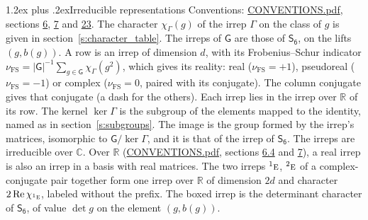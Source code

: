 \documentclass[10pt,a4paper]{article}
\makeatletter
\renewcommand\section{\@startsection{section}{1}{\z@}{-3ex plus -1ex minus -.2ex}%
  {1.2ex plus .2ex}{\normalfont\large\sffamily\bfseries\color{parttitle}}}
\numberwithin{equation}{section}
\newcommand{\grp}[1]{\mathsf{#1}}
\newcommand{\irr}[1]{\text{\normalfont\scshape #1}}
\newcommand{\conjpair}[1]{{}^{#1}}
\newcommand{\irchar}[1]{\chi_{#1}}
\newcommand{\fsind}{\nu_{\mathrm{FS}}}
\makeatother
\begin{document}
\section{Irreducible representations}\label{s:irreps}
Conventions: \href{../../CONVENTIONS.pdf}{CONVENTIONS.pdf}, sections \href{../../../rotation/CONVENTIONS.pdf\#conv.6}{6}, \href{../../../rotation/CONVENTIONS.pdf\#conv.7}{7} and \href{../../CONVENTIONS.pdf\#conv.23}{23}.
\leavevmode\label{n:function.character}\label{n:irrep.Gamma}The character $\irchar{\Gamma}(g)$ of the irrep $\Gamma$ on the class of $g$ is given in section~\ref{s:character_table}. The irreps of $\grp{G}$ are those of \href{../../../rotation/data/pdf/S6.pdf}{$\grp{S_{6}}$}, on the lifts $(g, b(g))$.
\leavevmode\label{n:index.dimension}\label{n:index.frobenius}\label{n:head.irrep}\label{n:head.reality}A row is an irrep of dimension $d$, with its Frobenius--Schur indicator $\fsind = |\grp{G}|^{-1}\allowbreak\sum_{g\in\grp{G}}\irchar{\Gamma}(g^2)$, which gives its reality: real ($\fsind = +1$), pseudoreal ($\fsind = -1$) or complex ($\fsind = 0$, paired with its conjugate). \label{n:head.conjugate}The column conjugate gives that conjugate (a dash for the others). \label{n:head.over.real}Each irrep lies in the irrep over $\mathbb{R}$ of its row. \label{n:head.kernel}The kernel $\ker\Gamma$ is the subgroup of the elements mapped to the identity, named as in section~\ref{s:subgroups}. \label{n:head.image}The image is the group formed by the irrep's matrices, isomorphic to $\grp{G}/\ker\Gamma$, and it is that of the irrep of \href{../../../rotation/data/pdf/S6.pdf}{$\grp{S_{6}}$}. The irreps are irreducible over $\mathbb{C}$. Over $\mathbb{R}$ (\href{../../CONVENTIONS.pdf}{CONVENTIONS.pdf}, sections \href{../../../rotation/CONVENTIONS.pdf\#conv.6.4}{6.4} and \href{../../../rotation/CONVENTIONS.pdf\#conv.7}{7}), a real irrep is also an irrep in a basis with real matrices. The two irreps $\conjpair{1}\irr{e}$, $\conjpair{2}\irr{e}$ of a complex-conjugate pair together form one irrep over $\mathbb{R}$ of dimension $2d$ and character $2\operatorname{Re}\irchar{\conjpair{1}\irr{e}}$, labeled without the prefix. \label{n:mark.determinant}The boxed irrep is the determinant character of \href{../../../rotation/data/pdf/S6.pdf}{$\grp{S_{6}}$}, of value $\det g$ on the element $(g, b(g))$.
\setlength{\emergencystretch}{2em}\par\setlength{\emergencystretch}{0pt}
\end{document}
